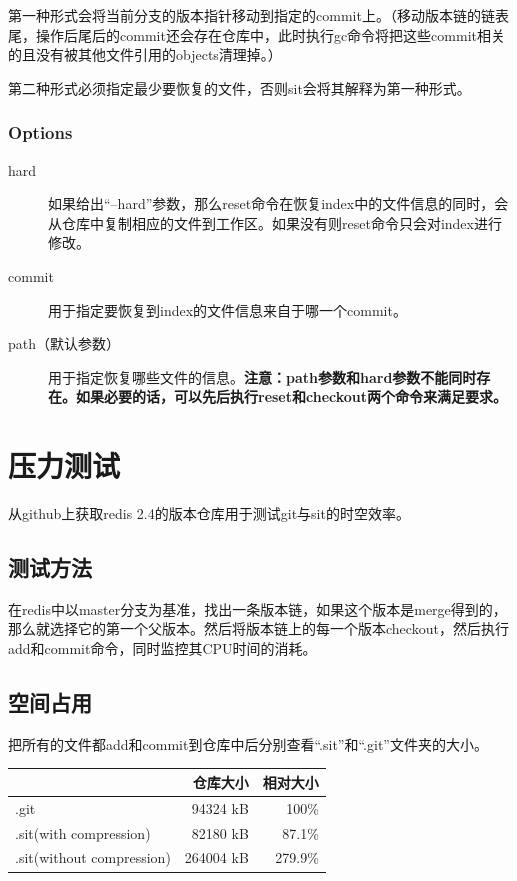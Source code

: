 \documentclass[11pt, a4paper, UTF8]{ctexart}
\begin{document}
第一种形式会将当前分支的版本指针移动到指定的commit上。（移动版本链的链表尾，操作后尾后的commit还会存在仓库中，此时执行gc命令将把这些commit相关的且没有被其他文件引用的objects清理掉。）

第二种形式必须指定最少要恢复的文件，否则sit会将其解释为第一种形式。
\subsubsection{Options}
\begin{description}
	\item[\YaHeiMono hard] 如果给出``--hard''参数，那么reset命令在恢复index中的文件信息的同时，会从仓库中复制相应的文件到工作区。如果没有则reset命令只会对index进行修改。
	\item[\YaHeiMono commit] 用于指定要恢复到index的文件信息来自于哪一个commit。
	\item[\YaHeiMono path（默认参数）] 用于指定恢复哪些文件的信息。\textbf{注意：path参数和hard参数不能同时存在。如果必要的话，可以先后执行reset和checkout两个命令来满足要求。}
\end{description}

\newpage
\section{压力测试}
从github上获取redis 2.4的版本仓库用于测试git与sit的时空效率。
\subsection{测试方法}
在redis中以master分支为基准，找出一条版本链，如果这个版本是merge得到的，那么就选择它的第一个父版本。然后将版本链上的每一个版本checkout，然后执行add和commit命令，同时监控其CPU时间的消耗。
\subsection{空间占用}
把所有的文件都add和commit到仓库中后分别查看``.sit''和``.git''文件夹的大小。
\begin{center}
\begin{tabular}{|l|r|r|}
\hline
                         & 仓库大小 & 相对大小\\
\hline
.git                     & 94324 kB           &   100\% \\
\hline
.sit(with compression)   & 82180 kB           &  87.1\% \\
\hline
.sit(without compression)& 264004 kB          & 279.9\% \\
\hline
\end{tabular}
\end{center}
\end{document}
